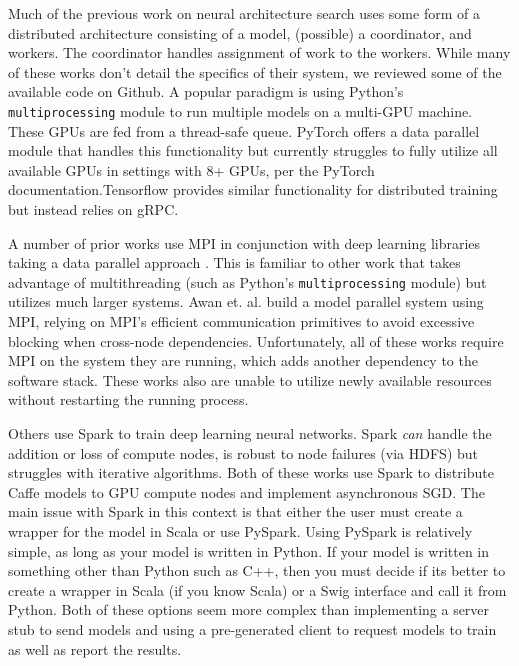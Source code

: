 \documentclass[conference]{IEEEtran}
\begin{document}
Much of the previous work on neural architecture search uses some form of a
distributed architecture consisting of a model, (possible) a coordinator, and workers. The
coordinator handles assignment of work to the workers. While many of these works
don't detail the specifics of their system, we reviewed some of the available
code on Github. A popular paradigm is using Python's \texttt{multiprocessing}
module to run multiple models on a multi-GPU machine. These GPUs are fed from a
thread-safe queue. PyTorch offers a data parallel module that handles this
functionality  but currently struggles to fully utilize all available GPUs in
settings with 8+ GPUs, per the PyTorch documentation.Tensorflow provides similar
functionality for distributed training but instead relies on gRPC.

A number of prior works use MPI in conjunction with deep learning libraries
taking a data parallel approach \cite{Awan:2016:ELM:2966884.2966912,
  Awan:2017:SCM:3018743.3018769}. This is familiar to other work that takes
advantage of multithreading (such as Python's \texttt{multiprocessing} module)
but utilizes much larger systems. Awan et. al.
\cite{Awan:2018:OBD:3236367.3236381} build a model parallel system using
MPI, relying on MPI's efficient communication primitives to avoid excessive
blocking when cross-node dependencies. Unfortunately, all of these works
require MPI on the system they are running, which adds another dependency
to the software stack. These works also are unable to utilize newly available
resources without restarting the running process.

Others \cite{journals/corr/MoritzNSJ15, journals/corr/KimPJY16} use Spark
\cite{Zaharia:2016:ASU:3013530.2934664} to
train deep learning neural networks. Spark \emph{can} handle the addition or loss
of compute nodes, is robust to node failures (via HDFS) but struggles with
iterative algorithms. Both of these works use Spark to distribute Caffe
\cite{Jia:2014:CCA:2647868.2654889} models to GPU compute nodes
and implement asynchronous SGD. The main issue with Spark in this context
is that either the user must create a wrapper for the model in Scala or
use PySpark. Using PySpark is relatively simple, as long as your model is
written in Python. If your model is written in something other than Python
such as C++, then you must decide if its better to create a wrapper in Scala
(if you know Scala) or a Swig interface and call it from Python. Both of
these options seem more complex than implementing a server stub to send
models and using a pre-generated client to request models to train as well
as report the results.
\end{document}
